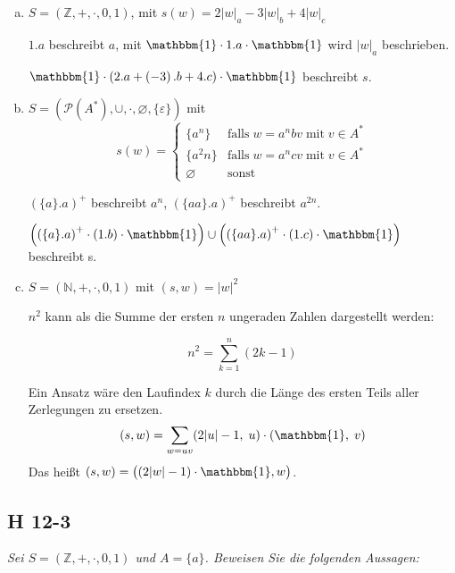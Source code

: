 \documentclass{scrartcl}
\begin{document}
\begin{enumerate}[(a)]
    \item $S = (\mathbb{Z}, +, \cdot, 0, 1)$, mit $s(w) = 2|w|_a -3|w|_b + 4|w|_c$

      $1.a$ beschreibt $a$, mit $\mathbbm{1} \cdot 1.a \cdot \mathbbm{1}$ wird $|w|_a$ beschrieben.

      $\mathbbm{1} \cdot \left(2.a + \left(-3\right).b + 4.c\right) \cdot \mathbbm{1}$ beschreibt $s$.

    \item $S = (\mathcal{P}(A^*), \cup, \cdot, \varnothing, \{\varepsilon\})$ mit
      \begin{equation*}
        s(w) = \begin{cases}
          \{a^n\}     &\text{falls}\;w = a^nbv\;\text{mit}\;v \in A^*\\
          \{a^2n\}    &\text{falls}\;w=a^ncv\;\text{mit}\;v \in A^*\\
          \varnothing &\text{sonst}
        \end{cases}
      \end{equation*}

      $(\{a\}.a)^+$ beschreibt $a^n$, $(\{aa\}.a)^+$ beschreibt $a^{2n}$.

      $\left(\left(\{a\}.a\right)^+ \cdot \left(1.b\right) \cdot \mathbbm{1}\right) \cup \left(\left(\{aa\}.a\right)^+ \cdot \left(1.c\right) \cdot \mathbbm{1}\right)$ beschreibt s.

    \item $S = (\mathbb{N}, +, \cdot, 0, 1)$ mit $(s, w) = |w|^2$

      $n^2$ kann als die Summe der ersten $n$ ungeraden Zahlen dargestellt werden:

      $$n^2 = \sum^n_{k=1} (2k-1)$$
      
      Ein Ansatz wäre den Laufindex $k$ durch die Länge des ersten Teils aller Zerlegungen zu ersetzen.
      \begin{align*}
        (s, w) &= \sum_{w=uv} (2|u|-1,\;u)\cdot(\mathbbm{1},\;v)\\
      \end{align*}
    Das heißt $(s, w) = \big((2|w|-1) \cdot \mathbbm{1}, w\big)$.
\end{enumerate}

\subsection{H 12-3}

\textsl{Sei $S = (\mathbb{Z}, +, \cdot, 0, 1)$ und $A = \{a\}$. Beweisen Sie die folgenden Aussagen:}
\end{document}
